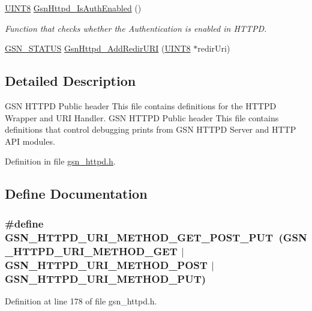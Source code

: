 \begin{DoxyCompactItemize}
\hyperlink{a00660_gab27e9918b538ce9d8ca692479b375b6a}{UINT8} \hyperlink{a00666_ga4bf4a027427d6e572bfa6123b9ecb625}{GsnHttpd\_\-IsAuthEnabled} ()
\begin{DoxyCompactList}\small\item\em Function that checks whether the Authentication is enabled in HTTPD. \end{DoxyCompactList}\item 
\hyperlink{a00660_gada5951904ac6110b1fa95e51a9ddc217}{GSN\_\-STATUS} \hyperlink{a00508_a09c586e0f7ed6b804701037328faa74a}{GsnHttpd\_\-AddRedirURI} (\hyperlink{a00660_gab27e9918b538ce9d8ca692479b375b6a}{UINT8} $\ast$redirUri)
\end{DoxyCompactItemize}


\subsection{Detailed Description}
GSN HTTPD Public header This file contains definitions for the HTTPD Wrapper and URI Handler. GSN HTTPD Public header This file contains definitions that control debugging prints from GSN HTTPD Server and HTTP API modules.

Definition in file \hyperlink{a00508_source}{gsn\_\-httpd.h}.



\subsection{Define Documentation}
\hypertarget{a00508_ad0bbd7c790ff09d8eabeaf3cfb5d01f2}{
\subsubsection[{GSN\_\-HTTPD\_\-URI\_\-METHOD\_\-GET\_\-POST\_\-PUT}]{\setlength{\rightskip}{0pt plus 5cm}\#define GSN\_\-HTTPD\_\-URI\_\-METHOD\_\-GET\_\-POST\_\-PUT~(GSN\_\-HTTPD\_\-URI\_\-METHOD\_\-GET $|$ GSN\_\-HTTPD\_\-URI\_\-METHOD\_\-POST $|$ GSN\_\-HTTPD\_\-URI\_\-METHOD\_\-PUT)}}
\label{a00508_ad0bbd7c790ff09d8eabeaf3cfb5d01f2}


Definition at line 178 of file gsn\_\-httpd.h.

